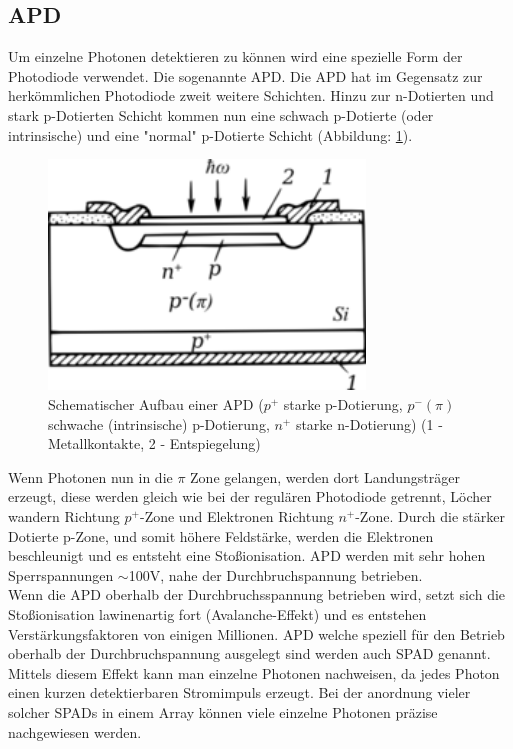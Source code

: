 \subsection{\acf{APD}}\label{subsec:apd}
Um einzelne Photonen detektieren zu können wird eine spezielle Form der Photodiode verwendet. Die sogenannte \ac{APD}. Die \ac{APD} hat im Gegensatz zur herkömmlichen Photodiode zweit weitere Schichten. Hinzu zur n-Dotierten und stark p-Dotierten Schicht kommen nun eine schwach p-Dotierte (oder intrinsische) und eine "normal" p-Dotierte Schicht (Abbildung: \ref{apd}). 
\begin{figure}[H]
	\centering
	\includegraphics[width=0.75\textwidth]{images/GrundlagenLaserentfernungsmessung/APD}
	\caption{Schematischer Aufbau einer \ac{APD} \cite{APD_Scematic} ($p^+$ starke p-Dotierung, $p^- (\pi)$ schwache (intrinsische) p-Dotierung, $n^+$ starke n-Dotierung) (1 - Metallkontakte, 2 - Entspiegelung)}
	\label{apd}
\end{figure}
Wenn Photonen nun in die $\pi$ Zone gelangen, werden dort Landungsträger erzeugt, diese werden gleich wie bei der regulären Photodiode getrennt, Löcher wandern Richtung $p^+$-Zone und Elektronen Richtung $n^+$-Zone. Durch die stärker Dotierte p-Zone, und somit höhere Feldstärke, werden die Elektronen beschleunigt und es entsteht eine Stoßionisation. \ac{APD} werden mit sehr hohen Sperrspannungen $\sim$100V, nahe der Durchbruchspannung betrieben. \cite{SPAD_mamamatsu} \\
Wenn die \ac{APD} oberhalb der Durchbruchsspannung betrieben wird, setzt sich die Stoßionisation lawinenartig fort (Avalanche-Effekt) und es entstehen Verstärkungsfaktoren von einigen Millionen. \ac{APD} welche speziell für den Betrieb oberhalb der Durchbruchspannung ausgelegt sind werden auch \ac{SPAD} genannt. Mittels diesem Effekt kann man einzelne Photonen nachweisen, da jedes Photon einen kurzen detektierbaren Stromimpuls erzeugt. Bei der anordnung vieler solcher \acp{SPAD} in einem Array können viele einzelne Photonen präzise nachgewiesen werden. \cite{SPAD_elmer}\\
